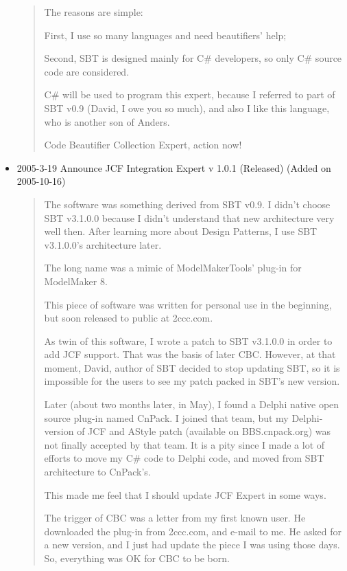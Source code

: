\begin{itemize}
\begin{quotation}
    The reasons are simple:

    First, I use so many languages and need beautifiers' help;

    Second, SBT is designed mainly for C\# developers, so only C\# source
    code are considered.

    C\# will be used to program this expert, because I referred to part
    of SBT v0.9 (David, I owe you so much), and also I like this
    language, who is another son of Anders.

    Code Beautifier Collection Expert, action now!

  \end{quotation}
  \item 2005-3-19 Announce JCF Integration Expert v 1.0.1 (Released)
  (Added on 2005-10-16)

  \begin{quotation}
    The software was something derived from SBT v0.9. I didn't choose
    SBT v3.1.0.0 because I didn't understand that new architecture very
    well then. After learning more about Design Patterns, I use SBT
    v3.1.0.0's architecture later.

    The long name was a mimic of ModelMakerTools' plug-in for
    ModelMaker 8.

    This piece of software was written for personal use in the beginning,
    but soon released to public at 2ccc.com.

    As twin of this software, I wrote a patch to SBT v3.1.0.0 in order to
    add JCF support. That was the basis of later CBC. However, at that
    moment, David, author of SBT decided to stop updating SBT, so it is
    impossible for the users to see my patch packed in SBT's new version.

    Later (about two months later, in May), I found a Delphi native open
    source plug-in named CnPack. I joined that team, but my
    Delphi-version of JCF and AStyle patch (available on
    BBS.cn\-pack.org) was not finally accepted by that team. It is a pity
    since I made a lot of efforts to move my C\# code to Delphi code, and
    moved from SBT architecture to CnPack's.

    This made me feel that I should update JCF Expert in some ways.

    The trigger of CBC was a letter from my first known user. He
    downloaded the plug-in from 2ccc.com, and e-mail to me. He asked for
    a new version, and I just had update the piece I was using those
    days. So, everything was OK for CBC to be born.

  \end{quotation}

\end{itemize}
